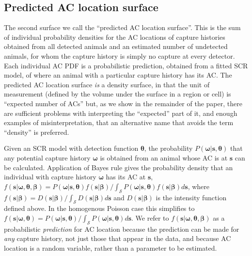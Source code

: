 \documentclass[useAMS,usenatbib,referee]{biom}
\begin{document}

\subsection{Predicted AC location surface} \label{s:racd}
 
The second surface we call the ``predicted AC location surface''. This is the sum of individual probability densities for the AC locations of capture histories obtained from all detected animals and an estimated number of undetected animals, for whom the capture history is simply no capture at every detector. Each individual AC PDF is a probabilistic prediction, obtained from a fitted SCR model, of where an animal with a particular capture history has its AC. The predicted AC location surface {\it is} a density surface, in that the unit of measurement (defined by the volume under the surface in a region or cell) is ``expected number of ACs'' but, as we show in the remainder of the paper, there are sufficient problems with interpreting the ``expected'' part of it, and enough examples of misinterpretation, that an alternative name that avoids the term ``density'' is preferred. 


Given an SCR model with detection function $\bm{\theta}$, the probability $P(\bm{\omega}|\bm{s},\bm{\theta})$ that any potential capture history $\bm{\omega}$ is obtained from an animal whose AC is at $\bm{s}$ can be calculated. Application of Bayes rule gives the probability density that an individual with capture history $\bm{\omega}$ has its AC at $\bm{s}$, $f(\bm{s}|\bm{\omega},\bm{\theta},\bm{\beta})=P(\bm{\omega}|\bm{s},\bm{\theta})f(\bm{s}|\bm{\beta})/\int_{\mathcal{S}} P(\bm{\omega}|\bm{s},\bm{\theta})f(\bm{s}|\bm{\beta})d\bm{s}$, where $f(\bm{s}|\bm{\beta})=D(\bm{s}|\bm{\beta})/\int_{\mathcal{S}} D(\bm{s}|\bm{\beta}) d\bm{s}$ and $D(\bm{s}|\bm{\beta})$ is the intensity function defined above. In the homogenous Poisson case this simplifies to $f(\bm{s}|\bm{\omega},\bm{\theta})=P(\bm{\omega}|\bm{s},\bm{\theta}) /\int_{\mathcal{S}} P(\bm{\omega}|\bm{s},\bm{\theta})d\bm{s}$. We refer to $f(\bm{s}|\bm{\omega},\bm{\theta},\bm{\beta})$ as a probabilistic {\it prediction} for AC location because the prediction can be made for {\it any} capture history, not just those that appear in the data, and because AC location is a random variable, rather than a parameter to be estimated. 
\end{document}
